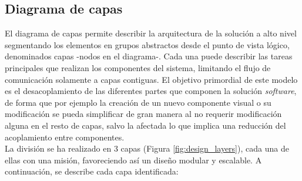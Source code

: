\documentclass[12pt,a4paper, twoside]{report}
\begin{document}
	\subsection{Diagrama de capas}
	
	El diagrama de capas permite describir la arquitectura de la solución a alto nivel segmentando los elementos en grupos abstractos desde el punto de vista lógico, denominados capas -nodos en el diagrama-. Cada una puede describir las tareas principales que realizan los componentes del sistema, limitando el flujo de comunicación solamente a capas contiguas. El objetivo primordial de este modelo es el desacoplamiento de las diferentes partes que componen la solución \textit{software}, de forma que por ejemplo la creación de un nuevo componente visual o su modificación se pueda simplificar de gran manera al no requerir modificación alguna en el resto de capas, salvo la afectada lo que implica una reducción del acoplamiento entre componentes. \\
		
	La división se ha realizado en 3 capas (Figura \ref{fig:design_layers}), cada una de ellas con una misión, favoreciendo así un diseño modular y escalable. A continuación, se describe cada capa identificada:
	
\end{document}

